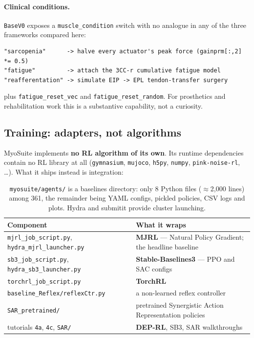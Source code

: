 \documentclass[11pt,a4paper]{article}
\begin{document}
\paragraph{Clinical conditions.} \texttt{BaseV0} exposes a \texttt{muscle\_condition} switch
with no analogue in any of the three frameworks compared here:

\begin{lstlisting}
"sarcopenia"      -> halve every actuator's peak force (gainprm[:,2] *= 0.5)
"fatigue"         -> attach the 3CC-r cumulative fatigue model
"reafferentation" -> simulate EIP -> EPL tendon-transfer surgery
\end{lstlisting}

\noindent
plus \texttt{fatigue\_reset\_vec} and \texttt{fatigue\_reset\_random}. For prosthetics and
rehabilitation work this is a substantive capability, not a curiosity.

\subsection{Training: adapters, not algorithms}

MyoSuite implements \textbf{no RL algorithm of its own}. Its runtime dependencies contain no
RL library at all (\texttt{gymnasium}, \texttt{mujoco}, \texttt{h5py}, \texttt{numpy},
\texttt{pink-noise-rl}, \ldots). What it ships instead is integration:

\begin{table}[h!]
\centering
\small
\begin{tabular}{@{}L{4.4cm}L{8.4cm}@{}}
\toprule
Component & What it wraps \\
\midrule
\texttt{mjrl\_job\_script.py}, \texttt{hydra\_mjrl\_launcher.py} & \textbf{MJRL} --- Natural Policy Gradient; the headline baseline \\
\texttt{sb3\_job\_script.py}, \texttt{hydra\_sb3\_launcher.py} & \textbf{Stable-Baselines3} --- PPO and SAC configs \\
\texttt{torchrl\_job\_script.py} & \textbf{TorchRL} \\
\texttt{baseline\_Reflex/reflexCtr.py} & a non-learned reflex controller \\
\texttt{SAR\_pretrained/} & pretrained Synergistic Action Representation policies \\
tutorials \texttt{4a}, \texttt{4c}, \texttt{SAR/} & \textbf{DEP-RL}, SB3, SAR walkthroughs \\
\bottomrule
\end{tabular}
\caption{\texttt{myosuite/agents/} is a baselines directory: only 8 Python files
($\approx$2{,}000 lines) among 361, the remainder being YAML configs, pickled policies,
CSV logs and plots. Hydra and submitit provide cluster launching.}
\end{table}
\end{document}
